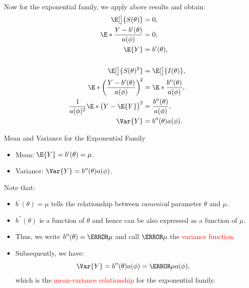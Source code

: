 \documentclass{article}\usepackage[]{graphicx}\usepackage[svgnames]{xcolor}
\begin{document}
Now for the exponential family, we apply above results and obtain:
\begin{align*}
    \E[\big]{S(\theta)}                                          & =0,                                             \\
    \E*{\frac{Y-b^{\prime}(\theta)}{a(\phi)}}                    & =0,                                             \\
    \E{Y}                                                        & =b^\prime(\theta),                              \\\\
    \E[\big]{S(\theta)^2}                                        & =\E[\big]{I(\theta)},                           \\
    \E*{\biggl(\frac{Y-b^\prime(\theta)}{a(\phi)} \biggr)^{\!2}} & =\E*{\frac{b^{\prime\prime}(\theta)}{a(\phi)}}, \\
    \frac{1}{a(\phi)^2}\E*{\bigl(Y-\E{Y}\bigr)^2}                & =\frac{b^{\prime\prime}(\theta)}{a(\phi)},      \\
    \Var{Y}                                                      & =b^{\prime\prime}(\theta)a(\phi).
\end{align*}
\begin{Regular}{Mean and Variance for the Exponential Family}
    \begin{itemize}
        \item Mean: $ \E{Y}=b^\prime(\theta)=\mu $.
        \item Variance: $ \Var{Y}=b^{\prime\prime}(\theta)a(\phi) $.
    \end{itemize}
\end{Regular}
Note that:
\begin{itemize}
    \item $ b^\prime(\theta)=\mu $ tells the relationship between \emph{canonical} parameter $ \theta $ and $ \mu $.
    \item $ b^{\prime\prime}(\theta) $ is a function of $ \theta $ and hence can be also expressed as a function of $ \mu $.
    \item Thus, we write $ b^{\prime\prime}(\theta)=\V{\mu} $ and call \textcolor{Red}{$ \V{\mu} $} the \textcolor{Red}{variance function}.
    \item Subsequently, we have:
          \[ \Var{Y}=b^{\prime\prime}(\theta)a(\phi)=\V{\mu}a(\phi), \]
          which is the \textcolor{Red}{mean-variance relationship} for the exponential family.
\end{itemize}
\end{document}
